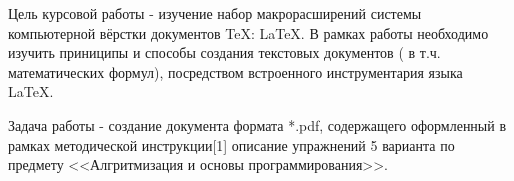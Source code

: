 \setcounter{page}{3}
\setlength{\parskip}{5pt}
\setlength{\parindent}{1,25cm}
\linespread{1.3}
\pagestyle{plain}
\fontsize{14pt}{16.8pt}\selectfont

\newpage
\begin{center}
\label{sec:intro}
\end{center}
\par
\fontsize{14pt}{16.8pt}\selectfont
Цель курсовой работы - изучение набор макрорасширений системы компьютерной вёрстки документов TeX: LaTeX. В рамках работы необходимо изучить приниципы и способы создания текстовых документов ( в т.ч. математических формул), посредством встроенного инструментария языка LaTeX.
\par
\fontsize{14pt}{16.8pt}\selectfont
Задача работы - создание документа формата *.pdf, содержащего оформленный в рамках методической инструкции[1] описание упражнений 5 варианта по предмету <<Алгритмизация и основы программирования>>.

